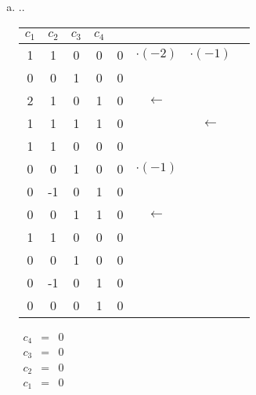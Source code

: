 \begin{enumerate}[a)]
				    \item ..
				  		
							\begin{tabular} {cccc|cccc}
								$c_1$ & $c_2$ & $c_3$ & $c_4$ & & &\\
								\hline
								1 & 1 & 0 & 0 & 0 & $\cdot(-2)$ & $\cdot(-1)$ & \\
								0 & 0 & 1 & 0 & 0 & & & \\
								2 & 1 & 0 & 1 & 0 & $\leftarrow$ & & \\
								1 & 1 & 1 & 1 & 0 & & $\leftarrow$ & \\
								\hline
								1 & 1 & 0 & 0 & 0 & & & \\
								0 & 0 & 1 & 0 & 0 & $\cdot(-1)$ & & \\
								0 & -1 & 0 & 1 & 0 & & & \\
								0 & 0 & 1 & 1 & 0 & $\leftarrow$ & & \\
								\hline
								1 & 1 & 0 & 0 & 0 & & & \\
								0 & 0 & 1 & 0 & 0 & & & \\
								0 & -1 & 0 & 1 & 0 & & & \\
								0 & 0 & 0 & 1 & 0 & & & \\
							\end{tabular}
						
						
						
							$\begin{array} {ccc}
								c_4 & = & 0\\
								c_3 & = & 0\\
								c_2 & = & 0\\
								c_1 & = & 0\\
							\end{array}$
								
				\end{enumerate}
				